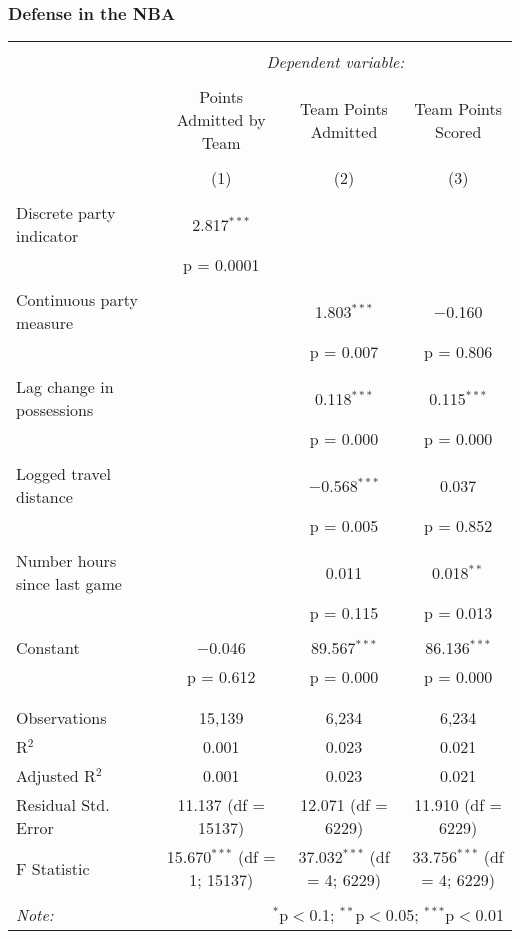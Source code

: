 \documentclass{beamer}
\begin{document}
\begin{frame}   \frametitle{Defense in the NBA}
  \begin{adjustwidth}{-.75cm}{}
  \tiny{  %
\begin{tabular}{@{\extracolsep{5pt}}lccc}  \\[-1.8ex]\hline  \hline \\[-1.8ex]   & \multicolumn{3}{c}{\textit{Dependent variable:}} \\  \cline{2-4}  \\[-1.8ex] & Points Admitted by Team & Team Points Admitted & Team Points Scored \\  \\[-1.8ex] & (1) & (2) & (3)\\  \hline \\[-1.8ex]   Discrete party indicator & 2.817$^{***}$ &  &  \\    & p = 0.0001 &  &  \\    & & & \\   Continuous party measure &  & 1.803$^{***}$ & $-$0.160 \\    &  & p = 0.007 & p = 0.806 \\    & & & \\   Lag change in possessions &  & 0.118$^{***}$ & 0.115$^{***}$ \\    &  & p = 0.000 & p = 0.000 \\    & & & \\   Logged travel distance &  & $-$0.568$^{***}$ & 0.037 \\    &  & p = 0.005 & p = 0.852 \\    & & & \\   Number hours since last game &  & 0.011 & 0.018$^{**}$ \\    &  & p = 0.115 & p = 0.013 \\    & & & \\   Constant & $-$0.046 & 89.567$^{***}$ & 86.136$^{***}$ \\    & p = 0.612 & p = 0.000 & p = 0.000 \\    & & & \\  \hline \\[-1.8ex]  Observations & 15,139 & 6,234 & 6,234 \\  R$^{2}$ & 0.001 & 0.023 & 0.021 \\  Adjusted R$^{2}$ & 0.001 & 0.023 & 0.021 \\  Residual Std. Error & 11.137 (df = 15137) & 12.071 (df = 6229) & 11.910 (df = 6229) \\  F Statistic & 15.670$^{***}$ (df = 1; 15137) & 37.032$^{***}$ (df = 4; 6229) & 33.756$^{***}$ (df = 4; 6229) \\  \hline  \hline \\[-1.8ex]  \textit{Note:}  & \multicolumn{3}{r}{$^{*}$p$<$0.1; $^{**}$p$<$0.05; $^{***}$p$<$0.01} \\  \end{tabular}    }
\end{adjustwidth} 
\end{frame}
\end{document}
